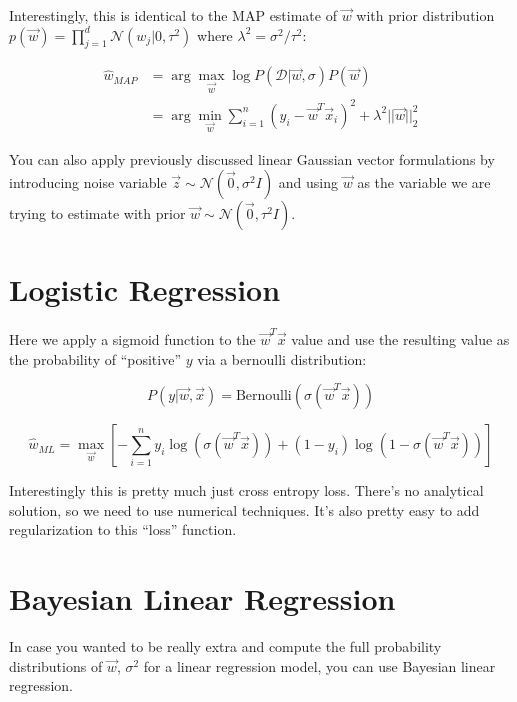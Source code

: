 \documentclass[a4paper,12pt]{report}
\begin{document}
Interestingly, this is identical to the MAP estimate of $\vec w$ with prior distribution $p(\vec w) = \prod_{j=1}^d \mathcal N(w_j | 0, \tau^2)$ where $\lambda^2 = \sigma^2/\tau^2$:

\begin{equation}
\begin{split}
\hat w_{MAP} &= \arg\max_{\vec w} \log P(\mathcal D | \vec w, \sigma)P(\vec w) \\
&= \arg\min_{\vec w} \sum_{i=1}^{n} (y_i - \vec w^T \vec x_i)^2 + \lambda^2 ||\vec w||_2^2
\end{split}
\end{equation}


You can also apply previously discussed linear Gaussian vector formulations by introducing noise variable $\vec z \sim \mathcal N(\vec 0, \sigma^2 I)$ and using $\vec w$ as the variable we are trying to estimate with prior $\vec w \sim \mathcal N (\vec 0, \tau^2 I)$. 

\section{Logistic Regression}

Here we apply a sigmoid function to the $\vec w^T \vec x$ value and use the resulting value as the probability of ``positive'' $y$ via a bernoulli distribution:

\begin{equation}
P(y | \vec w, \vec x) = \text{Bernoulli}(\sigma(\vec w^T \vec x))
\end{equation}

\begin{equation}
\hat w_{ML} = \max_{\vec w}[-\sum_{i=1}^{n} y_i\log(\sigma(\vec w^T\vec x)) + (1-y_i) \log(1-\sigma(\vec w^T \vec x))  ]
\end{equation}

Interestingly this is pretty much just cross entropy loss. There's no analytical solution, so we need to use numerical techniques. It's also pretty easy to add regularization to this ``loss'' function.

\section{Bayesian Linear Regression}

In case you wanted to be really extra and compute the full probability distributions of $\vec w$, $\sigma^2$ for a linear regression model, you can use Bayesian linear regression.
\end{document}
